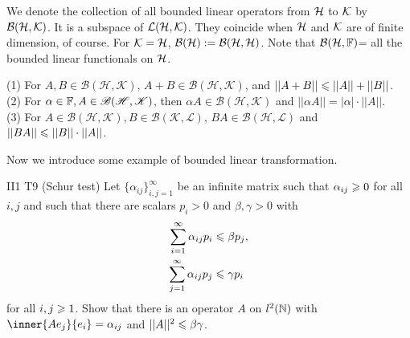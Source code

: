 We denote the collection of all bounded linear operators from $\mathcal{H}$ to $\mathcal{K}$ by $\mathcal{B}(\mathcal{H}, \mathcal{K})$. It is a subspace
of $\mathcal{L}(\mathcal{H}, \mathcal{K})$. They coincide when $\mathcal{H}$ and $\mathcal{K}$ are of finite dimension, of course.
For $\mathcal{K}=\mathcal{H}$, $\mathcal{B}(\mathcal{H}):=\mathcal{B}(\mathcal{H},\mathcal{H})$. Note that $\mathcal{B}(\mathcal{H},\mathbb{F})$= all the bounded linear functionals on $\mathcal{H}$.


\begin{proposition}
    (1) For $A,B\in\mathscr{B}(\mathscr{H},\mathscr{K})$,
    $A+B\in\mathscr{B}(\mathscr{H},\mathscr{K})$, and $||A+B||\leqslant ||A||+||B||$.\\
    (2) For $\alpha\in\mathbb{F}, A\in\mathscr{B}(\mathscr{H},\mathscr{K})$, then $\alpha A\in\mathscr{B}(\mathscr{H},\mathscr{K})$ and $||\alpha A||=|\alpha|\cdot||A||$.\\
    (3) For $A\in\mathscr{B}(\mathscr{H},\mathscr{K}), B\in\mathscr{B}(\mathscr{K},\mathscr{L})$, $BA\in\mathscr{B}(\mathscr{H},\mathscr{L})$ and $||BA||\leqslant ||B||\cdot ||A||$.
\end{proposition}


Now we introduce some example of bounded linear transformation.


\begin{exercise}{II1 T9}{}
    (Schur test) Let $\{\alpha_{ij}\}_{i,j=1}^{\infty}$ be an infinite matrix such that $\alpha_{ij}\geqslant 0$ for all $i,j$ and 
    such that there are scalars $p_i>0$ and $\beta,\gamma>0$ with 
    \begin{align*}
        \sum\limits_{i=1}^{\infty}\alpha_{ij}p_i &\leqslant \beta p_j,\\
        \sum\limits_{j=1}^{\infty}\alpha_{ij}p_j &\leqslant \gamma p_i
    \end{align*}
    for all $i,j\geqslant 1$.
    Show that there is an operator $A$ on $l^2(\mathbb{N})$ with $\inner{Ae_j}{e_i}=\alpha_{ij}$ and $||A||^2\leqslant \beta\gamma$.
\end{exercise}


